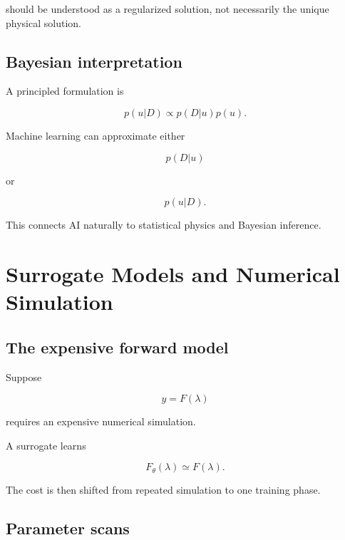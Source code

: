\documentclass[11pt,a4paper,oneside]{book}
\begin{document}
should be understood as a regularized solution, not necessarily the unique
physical solution.

\section{Bayesian interpretation}

A principled formulation is

\begin{equation}
p(u|D)
\propto
p(D|u)p(u).
\end{equation}

Machine learning can approximate either

\begin{equation}
p(D|u)
\end{equation}

or

\begin{equation}
p(u|D).
\end{equation}

This connects AI naturally to statistical physics and Bayesian inference.

\chapter{Surrogate Models and Numerical Simulation}

\section{The expensive forward model}

Suppose

\begin{equation}
y=F(\lambda)
\end{equation}

requires an expensive numerical simulation.

A surrogate learns

\begin{equation}
F_\theta(\lambda)\simeq F(\lambda).
\end{equation}

The cost is then shifted from repeated simulation to one training phase.

\section{Parameter scans}
\end{document}
